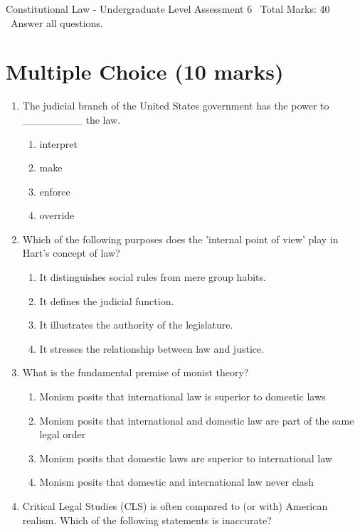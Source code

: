 \documentclass[12pt]{article}
\begin{document}
\begin{center}
Constitutional Law - Undergraduate Level Assessment 6 \
Total Marks: 40 \
Answer all questions.
\end{center}

\section*{Multiple Choice (10 marks)}
\begin{enumerate}[label=\arabic*.]
\item The judicial branch of the United States government has the power to \_\_\_\_\_\_\_\_ the law.
\begin{enumerate}[label=(\alph*)]
    \item interpret
    \item make
    \item enforce
    \item override
\end{enumerate}
\item Which of the following purposes does the 'internal point of view' play in Hart's concept of law?
\begin{enumerate}[label=(\alph*)]
    \item It distinguishes social rules from mere group habits.
    \item It defines the judicial function.
    \item It illustrates the authority of the legislature.
    \item It stresses the relationship between law and justice.
\end{enumerate}
\item What is the fundamental premise of monist theory?
\begin{enumerate}[label=(\alph*)]
    \item Monism posits that international law is superior to domestic laws
    \item Monism posits that international and domestic law are part of the same legal order
    \item Monism posits that domestic laws are superior to international law
    \item Monism posits that domestic and international law never clash
\end{enumerate}
\item Critical Legal Studies (CLS) is often compared to (or with) American realism. Which of the following statements is inaccurate?
\begin{enumerate}[label=(\alph*)]

\end{enumerate}
\end{enumerate}
\end{document}
